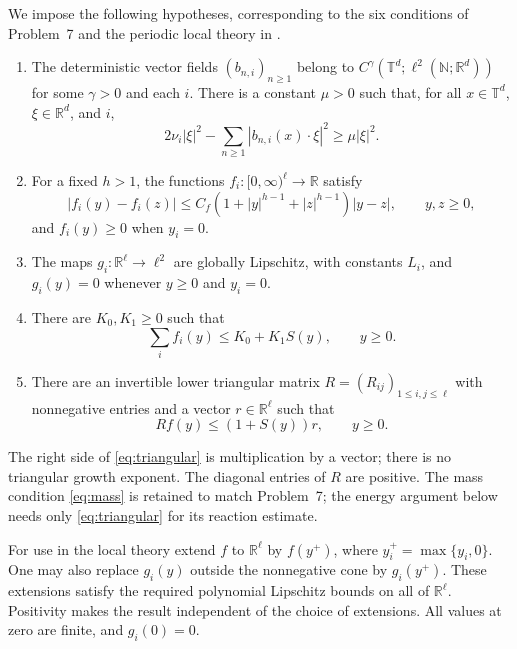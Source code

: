 \documentclass[11pt]{amsart}
\theoremstyle{definition}
\newcommand{\T}{\mathbb T}
\newcommand{\R}{\mathbb R}
\newcommand{\N}{\mathbb N}
\newcommand{\ellTwo}{\ell^2}
\numberwithin{equation}{section}
\begin{document}
We impose the following hypotheses, corresponding to the six conditions
of Problem~7 and the periodic local theory in
\cite[Assumption~8.4, pp.~97--98]{AVsurvey}.
\begin{enumerate}
\item The deterministic vector fields
$(b_{n,i})_{n\geq1}$ belong to
$C^\gamma(\T^d;\ellTwo(\N;\R^d))$ for some $\gamma>0$ and each $i$.
There is a constant $\mu>0$ such that, for all $x\in\T^d$, $\xi\in\R^d$,
and $i$,
\begin{equation}\label{eq:parabolicity}
2\nu_i|\xi|^2-\sum_{n\geq1}|b_{n,i}(x)\cdot\xi|^2
 \geq\mu|\xi|^2.
\end{equation}
\item For a fixed $h>1$, the functions $f_i:[0,\infty)^\ell\to\R$ satisfy
\begin{equation}\label{eq:reaction-growth}
|f_i(y)-f_i(z)|\leq C_f(1+|y|^{h-1}+|z|^{h-1})|y-z|,
 \qquad y,z\geq0,
\end{equation}
and $f_i(y)\geq0$ when $y_i=0$.
\item The maps $g_i:\R^\ell\to\ellTwo$ are globally Lipschitz, with
constants $L_i$, and $g_i(y)=0$ whenever $y\geq0$ and $y_i=0$.
\item There are $K_0,K_1\geq0$ such that
\begin{equation}\label{eq:mass}
\sum_i f_i(y)\leq K_0+K_1S(y),\qquad y\geq0.
\end{equation}
\item There are an invertible lower triangular matrix
$R=(R_{ij})_{1\leq i,j\leq\ell}$ with nonnegative entries and a vector
$r\in\R^\ell$ such that
\begin{equation}\label{eq:triangular}
Rf(y)\leq (1+S(y))r,\qquad y\geq0.
\end{equation}
\end{enumerate}
The right side of \eqref{eq:triangular} is multiplication by a vector;
there is no triangular growth exponent. The diagonal entries of $R$
are positive. The mass condition \eqref{eq:mass} is retained to match
Problem~7; the energy argument below needs only
\eqref{eq:triangular} for its reaction estimate.

For use in the local theory extend $f$ to $\R^\ell$ by $f(y^+)$,
where $y_i^+=\max\{y_i,0\}$. One may also replace $g_i(y)$ outside the
nonnegative cone by $g_i(y^+)$. These extensions satisfy the required
polynomial Lipschitz bounds on all of $\R^\ell$. Positivity makes the
result independent of the choice of extensions. All values at zero are
finite, and $g_i(0)=0$.
\end{document}

